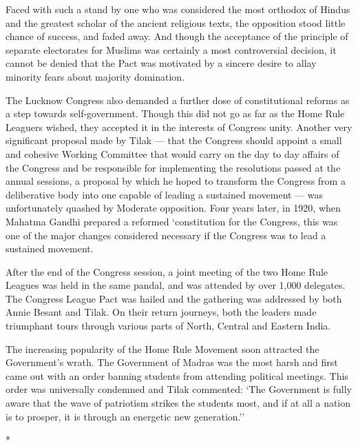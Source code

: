 Faced with such a stand by one who was considered the most orthodox of Hindus and the greatest scholar of the ancient religious texts, the opposition stood little chance of success, and faded away. And though the acceptance of the principle of separate electorates for Muslims was certainly a most controversial decision, it cannot be denied that the Pact was motivated by a sincere desire to allay minority fears about majority domination.

The Lucknow Congress also demanded a further dose of constitutional reforms as a step towards self-government. Though this did not go as far as the Home Rule Leaguers wished, they accepted it in the interests of Congress unity. Another very significant proposal made by Tilak --- that the Congress should appoint a small and cohesive Working Committee that would carry on the day to day affairs of the Congress and be responsible for implementing the resolutions passed at the annual sessions, a proposal by which he hoped to transform the Congress from a deliberative body into one capable of leading a sustained movement --- was unfortunately quashed by Moderate opposition. Four years later, in 1920, when Mahatma Gandhi prepared a reformed `constitution for the Congress, this was one of the major changes considered necessary if the Congress was to lead a sustained movement.

After the end of the Congress session, a joint meeting of the two Home Rule Leagues was held in the same pandal, and was attended by over 1,000 delegates. The Congress League Pact was hailed and the gathering was addressed by both Annie Besant and Tilak. On their return journeys, both the leaders made triumphant tours through various parts of North, Central and Eastern India.

The increasing popularity of the Home Rule Movement soon attracted the Government's wrath. The Government of Madras was the most harsh and first came out with an order banning students from attending political meetings. This order was universally condemned and Tilak commented: `The Government is fully aware that the wave of patriotism strikes the students most, and if at all a nation is to prosper, it is through an energetic new generation.''

\begin{center}*\end{center}

\paragraph*{}

